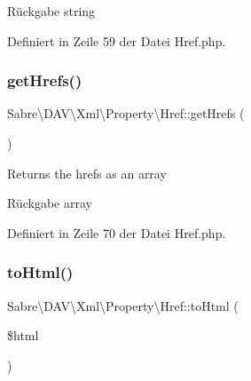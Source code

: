 \begin{DoxyReturn}{Rückgabe}
string 
\end{DoxyReturn}


Definiert in Zeile 59 der Datei Href.\+php.

\mbox{\label{class_sabre_1_1_d_a_v_1_1_xml_1_1_property_1_1_href_ad31c468be31868cdb742aa4c30a9615c}} 
\subsubsection{\texorpdfstring{get\+Hrefs()}{getHrefs()}}
{\footnotesize\ttfamily Sabre\textbackslash{}\+D\+A\+V\textbackslash{}\+Xml\textbackslash{}\+Property\textbackslash{}\+Href\+::get\+Hrefs (\begin{DoxyParamCaption}{ }\end{DoxyParamCaption})}

Returns the hrefs as an array

\begin{DoxyReturn}{Rückgabe}
array 
\end{DoxyReturn}


Definiert in Zeile 70 der Datei Href.\+php.

\mbox{\label{class_sabre_1_1_d_a_v_1_1_xml_1_1_property_1_1_href_a893c9969f099f1b54c0f852b0684c28f}} 
\subsubsection{\texorpdfstring{to\+Html()}{toHtml()}}
{\footnotesize\ttfamily Sabre\textbackslash{}\+D\+A\+V\textbackslash{}\+Xml\textbackslash{}\+Property\textbackslash{}\+Href\+::to\+Html (\begin{DoxyParamCaption}\item[{\mbox{\hyperlink{class_sabre_1_1_d_a_v_1_1_browser_1_1_html_output_helper}{Html\+Output\+Helper}}}]{\$html }\end{DoxyParamCaption})}

